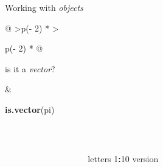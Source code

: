 \documentclass[
  11pt,
  ignorenonframetext,
]{beamer}
\newcommand{\VERB}{\Verb[commandchars=\\\{\}]}
\newenvironment{Shaded}{\begin{snugshade}}{\end{snugshade}}
\newcommand{\DecValTok}[1]{\textcolor[rgb]{0.00,0.00,0.81}{#1}}
\newcommand{\FunctionTok}[1]{\textcolor[rgb]{0.13,0.29,0.53}{\textbf{#1}}}
\newcommand{\NormalTok}[1]{#1}
\newcommand{\SpecialCharTok}[1]{\textcolor[rgb]{0.81,0.36,0.00}{\textbf{#1}}}
\newlength\ShadedFrameSep
\newcommand{\ctop}{\vspace{\ShadedFrameSep}}  %
\begin{document}
\begin{frame}{Working with \emph{objects}}
\begin{longtable}[]{@{}
  >{\raggedleft\arraybackslash}p{(\columnwidth - 2\tabcolsep) * }
  >{\raggedright\arraybackslash}p{(\columnwidth - 2\tabcolsep) * }@{}}
\begin{minipage}[t]{\linewidth}
is it a \emph{vector}?
\end{minipage} & \begin{minipage}[t]{\linewidth}\raggedright
\begin{Shaded}
\begin{Highlighting}[]
\FunctionTok{is.vector}\NormalTok{(pi)}
\end{Highlighting}
\end{Shaded}
\end{minipage} \\
\bottomrule\noalign{}
\end{longtable}

\begin{columns}[c]
\begin{column}{0.15\textwidth}
\end{column}


\begin{column}{0.35\textwidth}
\begin{Shaded}
\begin{Highlighting}[]
\NormalTok{letters}
\DecValTok{1}\SpecialCharTok{:}\DecValTok{10}
\NormalTok{version}
\end{Highlighting}
\end{Shaded}
\end{column}

\begin{column}{0.1\textwidth}
\end{column}
\end{columns}
\end{frame}
\end{document}
